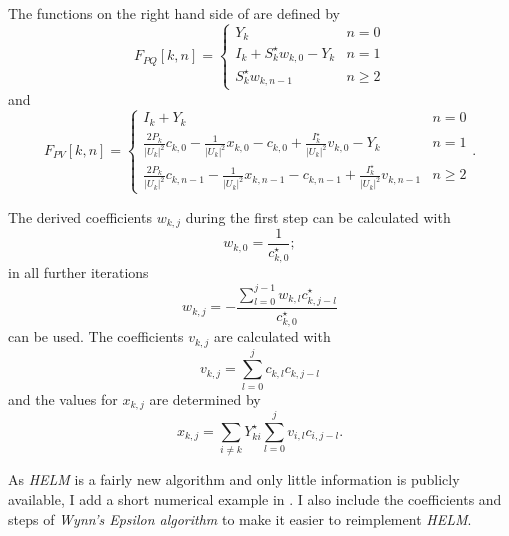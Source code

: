The functions on the right hand side of  are defined by
\begin{equation}
	F_{PQ}[k,n] = 
	\begin{cases}
		Y_k & n = 0 \\
		I_k + S_k^\star w_{k,0} - Y_k & n = 1 \\
		S_k^\star w_{k,n - 1} & n \ge 2
	\end{cases}
\end{equation}
and
\begin{equation}
	F_{PV}[k,n] = 
	\begin{cases}
		I_k + Y_k & n = 0 \\
		\frac{2 P_k}{|U_k|^2} c_{k,0} - \frac{1}{|U_k|^2} x_{k,0} - c_{k,0} + \frac{I_k^\star}{|U_k|^2} v_{k,0} - Y_k & n = 1 \\
		\frac{2 P_k}{|U_k|^2} c_{k,n-1} - \frac{1}{|U_k|^2} x_{k,n-1} - c_{k,n-1} + \frac{I_k^\star}{|U_k|^2} v_{k,n-1} & n \ge 2
	\end{cases}.
\end{equation}

The derived coefficients $w_{k,j}$ during the first step can be calculated with
\begin{equation}
	w_{k,0} = \frac{1}{c_{k,0}^\star};
\end{equation}
in all further iterations
\begin{equation}
	w_{k,j} = - \frac{\sum_{l = 0}^{j - 1} w_{k,l} c_{k,j - l}^\star}{c_{k,0}^\star}
\end{equation}
can be used. The coefficients $v_{k,j}$ are calculated with
\begin{equation}
	v_{k,j} = \sum_{l = 0}^j c_{k,l} c_{k,j - l}
\end{equation}
and the values for $x_{k,j}$ are determined by
\begin{equation}
	x_{k,j} = \sum_{i \ne k} Y_{ki}^\star \sum_{l = 0}^j v_{i,l} c_{i,j - l}.
\end{equation}

As \emph{HELM} is a fairly new algorithm and only little information is publicly available, I add a short numerical example in . I also include the coefficients and steps of \emph{Wynn's Epsilon algorithm} to make it easier to reimplement \emph{HELM}.